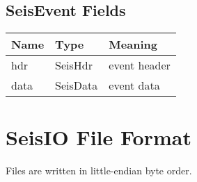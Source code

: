\documentclass[letterpaper,11pt,english]{sphinxmanual}
\begin{document}
\subsection{SeisEvent Fields}
\label{\detokenize{src/Appendices/seisdata_fields:seisevent-fields}}

\begin{savenotes}\sphinxattablestart
\centering
\begin{tabulary}{\linewidth}[t]{|T|T|T|}
\hline
\sphinxstyletheadfamily 
Name
&\sphinxstyletheadfamily 
Type
&\sphinxstyletheadfamily 
Meaning
\\
\hline
hdr
&
SeisHdr
&
event header
\\
\hline
data
&
SeisData
&
event data
\\
\hline
\end{tabulary}
\par
\sphinxattableend\end{savenotes}


\section{SeisIO File Format}
\label{\detokenize{src/Appendices/seisdata_fileformat:seisio-file-format}}\label{\detokenize{src/Appendices/seisdata_fileformat:seisdata-file-format}}\label{\detokenize{src/Appendices/seisdata_fileformat::doc}}
Files are written in little-endian byte order.
\end{document}
